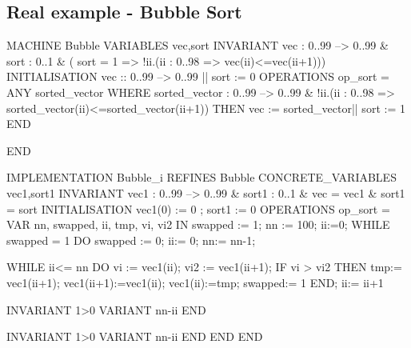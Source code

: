 \documentclass[10pt,a4paper]{article}
\begin{document}
\subsection{Real example - Bubble Sort}

\begin{ccode}
MACHINE
   Bubble
VARIABLES
   vec,sort
INVARIANT
   vec : 0..99 --> 0..99 & sort : 0..1 &
   ( sort = 1 =>  !ii.(ii : 0..98 => vec(ii)<=vec(ii+1)))
INITIALISATION
   vec :: 0..99 --> 0..99 || sort := 0
OPERATIONS
   op_sort =
   ANY sorted_vector WHERE
    sorted_vector : 0..99 --> 0..99 &
    !ii.(ii : 0..98 => sorted_vector(ii)<=sorted_vector(ii+1))
   THEN
    vec := sorted_vector|| sort := 1
   END

END


IMPLEMENTATION
   Bubble_i
REFINES
   Bubble
CONCRETE_VARIABLES
   vec1,sort1
INVARIANT
   vec1 : 0..99 --> 0..99 & sort1 : 0..1 &
   vec = vec1 & sort1 = sort
INITIALISATION
   vec1(0) := 0  ;
   sort1 := 0
OPERATIONS
   op_sort =
   VAR nn, swapped, ii, tmp, vi, vi2 IN
	swapped := 1;
	nn := 100;
	ii:=0;
	WHILE swapped = 1 DO
		swapped := 0;
		ii:= 0;
		nn:= nn-1;

		WHILE ii<= nn DO
		vi :=  vec1(ii);
		vi2 := vec1(ii+1);
		IF vi > vi2 THEN
			tmp:= vec1(ii+1);
			vec1(ii+1):=vec1(ii);
			vec1(ii):=tmp;
			swapped:= 1
		END;
		ii:= ii+1

		INVARIANT 1>0
		VARIANT nn-ii
		END

	INVARIANT 1>0
	VARIANT nn-ii
	END
   END
END
\end{ccode}
\end{document}
